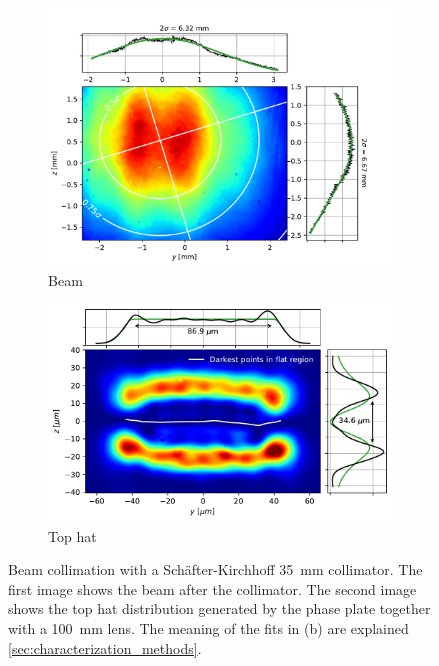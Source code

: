 \begin{figure}
    \begin{subfigure}{0.5\textwidth}
        \centering
        \includegraphics[width=\textwidth]{chapters/chapter_3/figures/beam_f35.pdf}
        \caption{Beam}
        \label{fig:beam_f35}
    \end{subfigure}
    \begin{subfigure}{0.5\textwidth}
        \centering
        \includegraphics[width=\textwidth]{chapters/chapter_3/figures/tophat_f35.pdf}
        \caption{Top hat}
        \label{fig:tophat_f35}
    \end{subfigure}
    \caption{Beam collimation with a Schäfter-Kirchhoff \SI{35}{mm} collimator. The first image shows the beam after the collimator. The second image shows the top hat distribution generated by the phase plate together with a \SI{100}{mm} lens. The meaning of the fits in (b) are explained \cref{sec:characterization_methods}.}
    \label{fig:collimator}
\end{figure}

